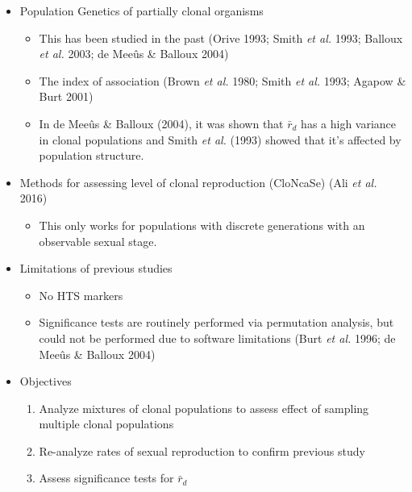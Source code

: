 \documentclass[double,12pt]{beavtex}
\providecommand{\tightlist}{%
  \setlength{\itemsep}{0pt}\setlength{\parskip}{0pt}}
\begin{document}
  \begin{itemize}
  \tightlist
  \item
    Population Genetics of partially clonal organisms
  
    \begin{itemize}
    \tightlist
    \item
      This has been studied in the past (Orive 1993; Smith \emph{et al.}
      1993; Balloux \emph{et al.} 2003; de Meeûs \& Balloux 2004)
    \item
      The index of association (Brown \emph{et al.} 1980; Smith \emph{et
      al.} 1993; Agapow \& Burt 2001)
    \item
      In de Meeûs \& Balloux (2004), it was shown that \(\bar{r}_d\) has a
      high variance in clonal populations and Smith \emph{et al.} (1993)
      showed that it's affected by population structure.
    \end{itemize}
  \item
    Methods for assessing level of clonal reproduction (CloNcaSe) (Ali
    \emph{et al.} 2016)
  
    \begin{itemize}
    \tightlist
    \item
      This only works for populations with discrete generations with an
      observable sexual stage.
    \end{itemize}
  \item
    Limitations of previous studies
  
    \begin{itemize}
    \tightlist
    \item
      No HTS markers
    \item
      Significance tests are routinely performed via permutation analysis,
      but could not be performed due to software limitations (Burt
      \emph{et al.} 1996; de Meeûs \& Balloux 2004)
    \end{itemize}
  \item
    Objectives
  
    \begin{enumerate}
    \def\labelenumi{\arabic{enumi}.}
    \tightlist
    \item
      Analyze mixtures of clonal populations to assess effect of sampling
      multiple clonal populations
    \item
      Re-analyze rates of sexual reproduction to confirm previous study
    \item
      Assess significance tests for \(\bar{r}_d\)
    \end{enumerate}
  \end{itemize}
  
\end{document}
